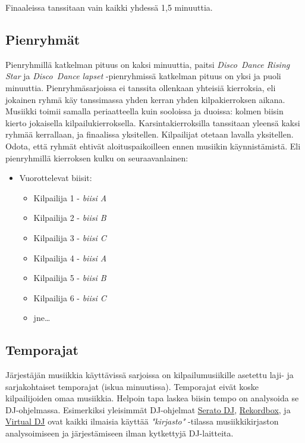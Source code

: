 \documentclass[12pt, a4paper, oneside]{article}
\begin{document}
Finaaleissa tanssitaan vain kaikki yhdessä 1,5 minuuttia.

\subsection{Pienryhmät} \label{subsec:pienryhmat}

Pienryhmillä katkelman pituus on kaksi minuuttia,
paitsi \textit{Disco~Dance Rising Star} ja \textit{Disco~Dance lapset} -pienryhmissä katkelman pituus on yksi ja puoli minuuttia.
Pienryhmäsarjoissa ei tanssita ollenkaan yhteisiä kierroksia,
eli jokainen ryhmä käy tanssimassa yhden kerran yhden kilpakierroksen aikana.
Musiikki toimii samalla periaatteella kuin sooloissa ja duoissa: kolmen biisin kierto jokaisella kilpailukierroksella.
Karsintakierroksilla tanssitaan yleensä kaksi ryhmää kerrallaan,
ja finaalissa yksitellen.
Kilpailijat otetaan lavalla yksitellen.
Odota, että ryhmät ehtivät aloituspaikoilleen ennen musiikin käynnistämistä.
Eli pienryhmillä kierroksen kulku on seuraavanlainen:

\begin{itemize}[nosep]
    \item Vuorottelevat biisit:
          \begin{itemize}
              \item Kilpailija 1 - \textit{biisi A}
              \item Kilpailija 2 - \textit{biisi B}
              \item Kilpailija 3 - \textit{biisi C}
              \item Kilpailija 4 - \textit{biisi A}
              \item Kilpailija 5 - \textit{biisi B}
              \item Kilpailija 6 - \textit{biisi C}
              \item jne\ldots
          \end{itemize}
\end{itemize}

\subsection{Temporajat} \label{subsec:temporajat}

Järjestäjän musiikkia käyttävissä sarjoissa on kilpailumusiikille asetettu laji- ja sarjakohtaiset temporajat (iskua minuutissa).
Temporajat eivät koske kilpailijoiden omaa musiikkia.
Helpoin tapa laskea biisin tempo on analysoida se DJ-ohjelmassa.
Esimerkiksi yleisimmät DJ-ohjelmat \href{https://serato.com/dj}{Serato DJ},
\href{https://rekordbox.com/}{Rekordbox},
ja \href{https://www.virtualdj.com/}{Virtual DJ}
ovat kaikki ilmaisia käyttää \textit{"kirjasto"} -tilassa musiikkikirjaston analysoimiseen ja järjestämiseen ilman kytkettyjä DJ-laitteita.
\end{document}
